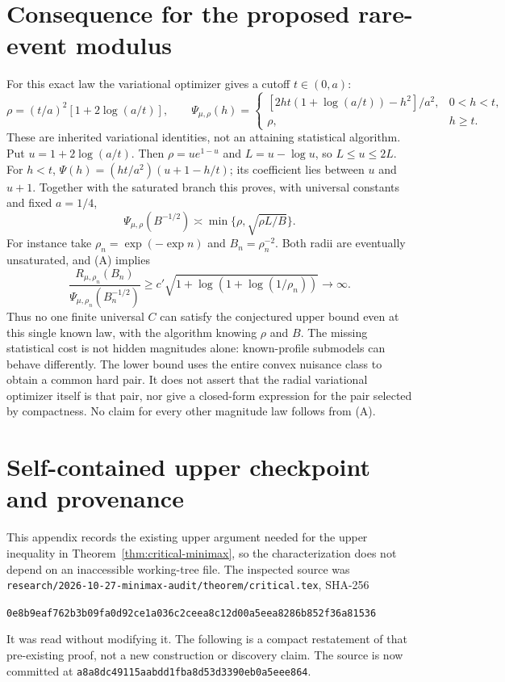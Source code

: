 \documentclass[11pt]{article}
\begin{document}
\section{Consequence for the proposed rare-event modulus}
For this exact law the variational optimizer gives a cutoff $t\in(0,a)$:
\[
 \rho=(t/a)^2[1+2\log(a/t)],\qquad
 \Psi_{\mu,\rho}(h)=
 \begin{cases}
 [2ht(1+\log(a/t))-h^2]/a^2,&0<h<t,\\
 \rho,&h\ge t.
 \end{cases}                                          \tag{E}
\]
These are inherited variational identities, not an attaining statistical
algorithm. Put $u=1+2\log(a/t)$. Then $\rho=u e^{1-u}$ and
$L=u-\log u$, so $L\le u\le2L$. For $h<t$,
$\Psi(h)=(ht/a^2)(u+1-h/t)$; its coefficient lies between $u$ and $u+1$.
Together with the saturated branch this proves, with universal constants
and fixed $a=1/4$,
\[
 \Psi_{\mu,\rho}(B^{-1/2})\asymp\min\{\rho,\sqrt{\rho L/B}\}.
\]
For instance take $\rho_n=\exp(-\exp n)$ and $B_n=\rho_n^{-2}$.
Both radii are eventually unsaturated, and (A) implies
\[
 \frac{R_{\mu,\rho_n}(B_n)}{\Psi_{\mu,\rho_n}(B_n^{-1/2})}
       \ge c'\sqrt{1+\log(1+\log(1/\rho_n))}\longrightarrow\infty.
\]
Thus no one finite universal $C$ can
satisfy the conjectured upper bound even at this single known law, with
the algorithm knowing $\rho$ and $B$. The missing statistical cost is not
hidden magnitudes alone: known-profile submodels can behave differently.
The lower bound uses the entire convex nuisance class to obtain a common
hard pair. It does not assert that the radial variational optimizer itself
is that pair, nor give a closed-form expression for the pair selected by
compactness. No claim for every other magnitude law follows from (A).

\appendix
\section{Self-contained upper checkpoint and provenance}
This appendix records the existing upper argument needed for the upper
inequality in Theorem~\ref{thm:critical-minimax}, so the characterization does not depend on an inaccessible
working-tree file. The inspected source was
\nolinkurl{research/2026-10-27-minimax-audit/theorem/critical.tex}, SHA-256
\begin{center}\small\nolinkurl{0e8b9eaf762b3b09fa0d92ce1a036c2ceea8c12d00a5eea8286b852f36a81536}\end{center}
It was read without modifying it. The following is a compact restatement of
that pre-existing proof, not a new construction or discovery claim.
The source is now committed at
\nolinkurl{a8a8dc49115aabdd1fba8d53d3390eb0a5eee864}.
\end{document}
